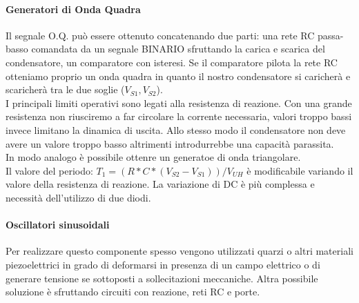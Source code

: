 \documentclass[12pt]{article}
\begin{document}
\paragraph{Generatori di Onda Quadra} Il segnale O.Q. può essere ottenuto concatenando due parti: una rete RC passa-basso comandata da un segnale BINARIO sfruttando la carica e scarica del condensatore, un comparatore con isteresi. Se il comparatore pilota la rete RC otteniamo proprio un onda quadra in quanto il nostro condensatore si caricherà e scaricherà tra le due soglie ($V_{S1}, V_{S2}$).\\
I principali limiti operativi sono legati alla resistenza di reazione. Con una grande resistenza non riusciremo a far circolare la corrente necessaria, valori troppo bassi invece limitano la dinamica di uscita. Allo stesso modo il condensatore non deve avere un valore troppo basso altrimenti introdurrebbe una capacità parassita.\\
In modo analogo è possibile ottenre un generatoe di onda triangolare.\\
Il valore del periodo: $T_{1} = (R*C*(V_{S2}-V_{S1}))/V_{UH}$ è modificabile variando il valore della resistenza di reazione. La variazione di DC è più complessa e necessità dell'utilizzo di due diodi.\\

\paragraph{Oscillatori sinusoidali} Per realizzare questo componente spesso vengono utilizzati quarzi o altri materiali piezoelettrici in grado di deformarsi in presenza di un campo elettrico o di generare tensione se sottoposti a sollecitazioni meccaniche. Altra possibile soluzione è sfruttando circuiti con reazione, reti RC e porte.

\end{document}
